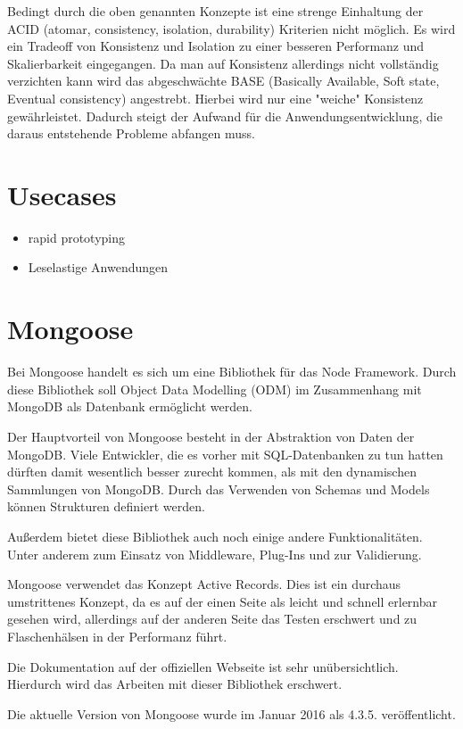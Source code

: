 Bedingt durch die oben genannten Konzepte ist eine strenge Einhaltung der ACID (atomar, consistency, isolation, durability) Kriterien nicht möglich. Es wird ein Tradeoff von Konsistenz und Isolation zu einer besseren Performanz und Skalierbarkeit eingegangen. Da man auf Konsistenz allerdings nicht vollständig verzichten kann wird das abgeschwächte BASE (Basically Available, Soft state, Eventual consistency) angestrebt. Hierbei wird nur eine "weiche" Konsistenz gewährleistet. Dadurch steigt der Aufwand für die Anwendungsentwicklung, die daraus entstehende Probleme abfangen muss.

\section{Usecases}\label{usecases}

\begin{itemize}
\itemsep1pt\parskip0pt
\item
  rapid prototyping
\item
  Leselastige Anwendungen
\end{itemize}

\section{Mongoose}\label{mongoose}

Bei Mongoose handelt es sich um eine Bibliothek für das Node Framework. Durch diese Bibliothek soll Object Data Modelling (ODM) im Zusammenhang mit MongoDB als Datenbank ermöglicht werden.

Der Hauptvorteil von Mongoose besteht in der Abstraktion von Daten der MongoDB. Viele Entwickler, die es vorher mit SQL-Datenbanken zu tun hatten dürften damit wesentlich besser zurecht kommen, als mit den dynamischen Sammlungen von MongoDB. Durch das Verwenden von Schemas und Models können Strukturen definiert werden.

Außerdem bietet diese Bibliothek auch noch einige andere Funktionalitäten. Unter anderem zum Einsatz von Middleware, Plug-Ins und zur Validierung.

Mongoose verwendet das Konzept Active Records. Dies ist ein durchaus umstrittenes Konzept, da es auf der einen Seite als leicht und schnell erlernbar gesehen wird, allerdings auf der anderen Seite das Testen erschwert und zu Flaschenhälsen in der Performanz führt.

Die Dokumentation auf der offiziellen Webseite ist sehr unübersichtlich. Hierdurch wird das Arbeiten mit dieser Bibliothek erschwert.

Die aktuelle Version von Mongoose wurde im Januar 2016 als 4.3.5. veröffentlicht.
